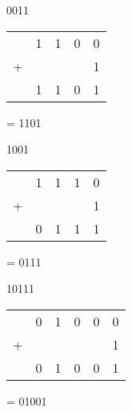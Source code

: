 \begin{enumerate}[label=(\alph*)]
\begin{figure}[H]
\end{figure}
\begin{figure}[H]
    \begin{minipage}[t]{0.45\textwidth}
        \item 0011
        \begin{table}[H]
            \centering
            \begin{tabularx}{0.47\textwidth}{XXXXX}
                & 1 & 1 & 0 &0 \\    
                + & & & & 1 \\
                \hline
                & 1 & 1 & 0 &1 \\
                \hline            
            \end{tabularx}
        \end{table}
        = 1101
    \end{minipage}\hfill
    \begin{minipage}[t]{0.45\textwidth}
        \item 1001
        \begin{table}[H]
            \centering
            \begin{tabularx}{0.47\textwidth}{XXXXX}
                & 1 & 1 & 1 & 0 \\    
                + & & & & 1 \\
                \hline
                & 0 & 1 & 1 &1 \\
                \hline            
            \end{tabularx}
        \end{table}
        = 0111
    \end{minipage}\hfill
\end{figure}
\begin{figure}[H]
    \begin{minipage}[t]{0.45\textwidth}
        \item 10111
        
        \begin{table}[H]
            \centering
            \begin{tabularx}{0.6\textwidth}{XXXXXX}
                & 0 & 1 & 0 &0 &0 \\    
                + & & & & & 1 \\
                \hline
                & 0 & 1 & 0 & 0 &1 \\
                \hline            
            \end{tabularx}
        \end{table}
        = 01001
    \end{minipage}\hfill
    \begin{minipage}[t]{0.45\textwidth}
        
    \end{minipage}\hfill
\end{figure}
\end{enumerate}

